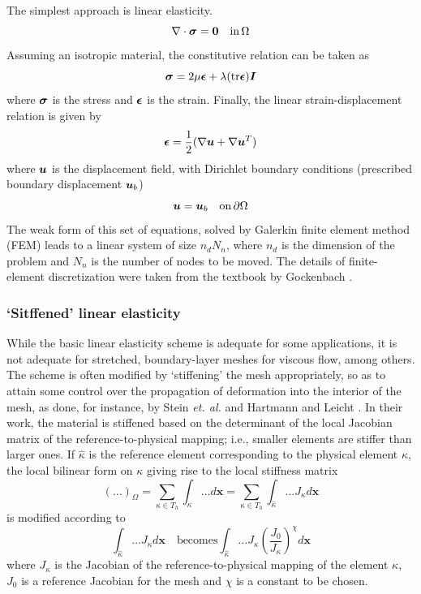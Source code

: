  The simplest approach is linear elasticity.
 \begin{equation}
 \nabla \cdot \boldsymbol{\sigma}  = \mathbf{0} \quad \text{in} \, \Omega
 \end{equation}
 Assuming an isotropic material, the constitutive relation can be taken as
 \begin{equation}
 \boldsymbol{\sigma} = 2\mu\boldsymbol{\epsilon} + \lambda (\mathrm{tr}\boldsymbol{\epsilon}) \boldsymbol{I}
 \label{linelast:constt}
 \end{equation}
 where $\boldsymbol{\sigma}$ is the stress and $\boldsymbol{\epsilon}$ is the strain.
 Finally, the linear strain-displacement relation is given by
 \begin{equation}
 \boldsymbol{\epsilon} = \frac12 (\nabla\boldsymbol{u}+\nabla\boldsymbol{u}^T)
 \label{linelast:strain}
 \end{equation}
 where $\boldsymbol{u}$ is the displacement field, with Dirichlet boundary conditions (prescribed boundary displacement $\boldsymbol{u}_b$)
 \begin{equation}
 \boldsymbol{u} = \boldsymbol{u}_b \quad \text{on} \, \partial\Omega
 \end{equation}
 The weak form of this set of equations, solved by Galerkin finite element method (FEM) leads to a linear system of size $n_d N_n$, where $n_d$ is the dimension of the problem and $N_n$ is the number of nodes to be moved. The details of finite-element discretization were taken from the textbook by Gockenbach \cite{gockenbach}.
 
 \subsubsection{`Sitffened' linear elasticity}
 \label{subsec:stiffelast}
 While the basic linear elasticity scheme is adequate for some applications, it is not adequate for stretched, boundary-layer meshes for viscous flow, among others. The scheme is often modified by `stiffening' the mesh appropriately, so as to attain some control over the propagation of deformation into the interior of the mesh, as done, for instance, by Stein \emph{et. al.} \cite{mm:fsielast} and Hartmann and Leicht \cite{curve:hartmann}. In their work, the material is stiffened based on the determinant of the local Jacobian matrix of the reference-to-physical mapping; i.e., smaller elements are stiffer than larger ones. If $\hat{\kappa}$ is the reference element corresponding to the physical element $\kappa$, the local bilinear form on $\kappa$ giving rise to the local stiffness matrix 
 \begin{equation}
 (\dots)_\Omega = \sum_{\kappa \in T_h} \int_{\kappa} \dots d\mathbf{x} = \sum_{\kappa \in T_h} \int_{\hat{\kappa}} \dots J_\kappa d\mathbf{x}
 \end{equation}
 is modified according to
 \begin{equation}
\int_{\hat{\kappa}} \dots J_\kappa d\mathbf{x} \quad \text{becomes} \int_{\hat{\kappa}} \dots J_\kappa \left(\frac{J_0}{J_\kappa}\right)^\chi d\mathbf{x}
 \end{equation}
 where $J_\kappa$ is the Jacobian of the reference-to-physical mapping of the element $\kappa$, $J_0$ is a reference Jacobian for the mesh and $\chi$ is a constant to be chosen.
 
